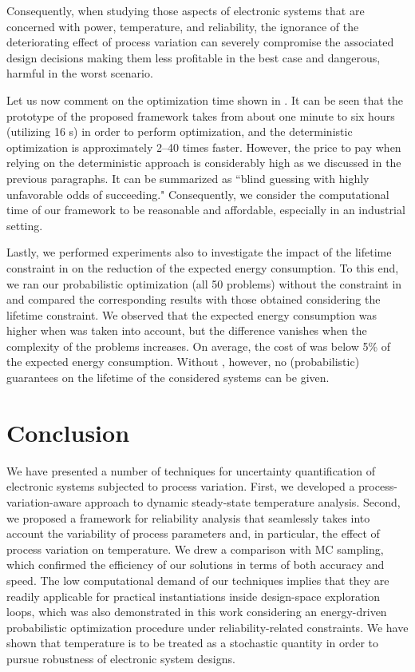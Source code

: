 Consequently, when studying those aspects of electronic systems that are
concerned with power, temperature, and reliability, the ignorance of the
deteriorating effect of process variation can severely compromise the associated
design decisions making them less profitable in the best case and dangerous,
harmful in the worst scenario.

Let us now comment on the optimization time shown in . It can
be seen that the prototype of the proposed framework takes from about one minute
to six hours (utilizing 16 s) in order to perform optimization, and
the deterministic optimization is approximately 2--40 times faster. However, the
price to pay when relying on the deterministic approach is considerably high as
we discussed in the previous paragraphs. It can be summarized as ``blind
guessing with highly unfavorable odds of succeeding." Consequently, we consider
the computational time of our framework to be reasonable and affordable,
especially in an industrial setting.

Lastly, we performed experiments also to investigate the impact of the lifetime
constraint in  on the reduction of the expected
energy consumption. To this end, we ran our probabilistic optimization (all 50
problems) without the constraint in  and compared
the corresponding results with those obtained considering the lifetime
constraint. We observed that the expected energy consumption was higher when
 was taken into account, but the difference
vanishes when the complexity of the problems increases. On average, the cost of
 was below 5\% of the expected energy consumption.
Without , however, no (probabilistic) guarantees on
the lifetime of the considered systems can be given.

\section{Conclusion}

We have presented a number of techniques for uncertainty quantification of
electronic systems subjected to process variation. First, we developed a
process-variation-aware approach to dynamic steady-state temperature analysis.
Second, we proposed a framework for reliability analysis that seamlessly takes
into account the variability of process parameters and, in particular, the
effect of process variation on temperature. We drew a comparison with \ac{MC}
sampling, which confirmed the efficiency of our solutions in terms of both
accuracy and speed. The low computational demand of our techniques implies that
they are readily applicable for practical instantiations inside design-space
exploration loops, which was also demonstrated in this work considering an
energy-driven probabilistic optimization procedure under reliability-related
constraints. We have shown that temperature is to be treated as a stochastic
quantity in order to pursue robustness of electronic system designs.

